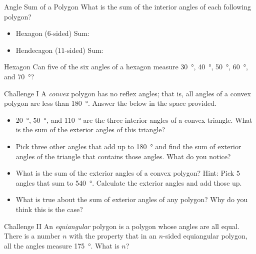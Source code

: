 \documentclass[14pt,letterpaper]{article}
\begin{document}
\begin{problem}{Angle Sum of a Polygon}
 What is the sum of the interior angles of each following polygon?

 \begin{itemize}
  \item Hexagon (\(6\)-sided)
  \hfill Sum: 
  \item Hendecagon (\(11\)-sided)
  \hfill Sum: 
 \end{itemize}
\end{problem}

\begin{problem}{Hexagon}
 Can five of the six angles of a hexagon measure \SI{30}{\degree},
 \SI{40}{\degree}, \SI{50}{\degree}, \SI{60}{\degree}, and \SI{70}{\degree}?
\end{problem}

\begin{problem}{Challenge I}
 A \emph{convex} polygon has no reflex angles; that is, all angles of a convex
 polygon are less than \SI{180}{\degree}. Answer the below in the space
 provided.

 \begin{itemize}
  \item \SI{20}{\degree}, \SI{50}{\degree}, and \SI{110}{\degree} are the three
  interior angles of a convex triangle. What is the sum of the exterior angles
  of this triangle? 
  \item Pick three other angles that add up to \SI{180}{\degree} and find the
  sum of exterior angles of the triangle that contains those angles. What do
  you notice? 
  \item What is the sum of the exterior angles of a convex polygon? Hint: Pick
  \(5\) angles that sum to \SI{540}{\degree}. Calculate the exterior angles and
  add those up. 
  \item What is true about the sum of exterior angles of any polygon? Why do
  you think this is the case? 
 \end{itemize}
\end{problem}

\begin{problem}{Challenge II}
  An \emph{equiangular} polygon is a polygon whose angles are all equal. There
  is a number \(n\) with the property that in an \(n\)-sided equiangular
  polygon, all the angles measure \SI{175}{\degree}. What is \(n\)?
\end{problem}
\end{document}
